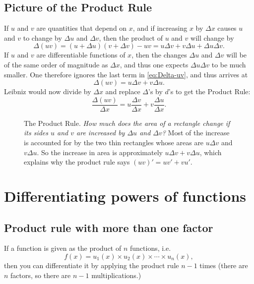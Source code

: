 \subsection{Picture of the Product Rule} 
\label{sec:picture-product-rule}
If $u$ and $v$ are quantities that depend on $x$, and if increasing $x$ by
$\Delta x$ causes $u$ and $v$ to change by $\Delta u$ and $\Delta v$, then the
product of $u$ and $v$ will change by
\begin{equation}
  \label{eq:Delta-uv}
  \Delta(uv)
  =(u+\Delta u)(v+\Delta v) - uv
  = u\Delta v+v\Delta u + \Delta u \Delta v.
\end{equation}
If $u$ and $v$ are differentiable functions of $x$, then the changes $\Delta u$
and $\Delta v$ will be of the same order of magnitude as $\Delta x$, and thus
one expects $\Delta u\Delta v$ to be much smaller.  One therefore ignores the
last term in \eqref{eq:Delta-uv}, and thus arrives at
\[
\Delta(uv) =  u\Delta v+v\Delta u.
\]
Leibniz would now divide by $\Delta x$ and replace $\Delta$'s by $d$'s
to get the Product Rule:
\[
\frac{\Delta(uv)}{\Delta x}
=  u\frac{\Delta v}{\Delta x}+v\frac{\Delta u}{\Delta x}.
\]
\begin{figure}[h]\centering
  
  \caption{The Product Rule. \textit{How much does the area of a rectangle
  change if its sides $u$ and $v$ are increased by $\Delta u$ and
  $\Delta v$? } Most of the increase is accounted for by the two thin
  rectangles whose areas are $u\Delta v$ and $v\Delta u$.  So the increase
  in area is approximately $u\Delta v + v\Delta u$, which explains why the
  product rule says $(uv)' = uv'+ vu'$. }
\end{figure}




\section{Differentiating powers of functions} 
\subsection{Product rule with more than one factor} 
If a function is given as the product of $n$ functions, i.e.
\[
f(x) = u_1(x) \times u_2(x) \times \cdots \times  u_n(x),
\]
then you can differentiate it by applying the product rule $n-1$ times
(there are $n$ factors, so there are $n-1$ multiplications.)





